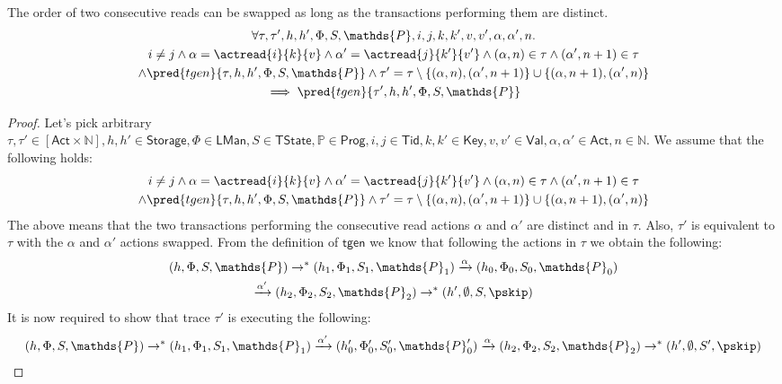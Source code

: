 \lem \label{lem:rr} The order of two consecutive reads can be swapped as long as the transactions performing them are distinct.
\begin{gather*}
	\forall \tau, \tau', h, h', \Phi, S, \mathds{P}, i, j, k, k', v, v', \alpha, \alpha', n \ldotp \\
	i \neq j \land \alpha = \actread{i}{k}{v} \land \alpha' = \actread{j}{k'}{v'} \land (\alpha, n) \in \tau \land (\alpha', n+1) \in \tau \\ \land \pred{tgen}{\tau, h, h', \Phi, S, \mathds{P}} \land \tau' = \tau \setminus \{(\alpha, n), (\alpha', n+1)\} \cup \{ (\alpha, n+1), (\alpha', n) \}
		\\	 
	 \implies \pred{tgen}{\tau', h, h', \Phi, S, \mathds{P}}
\end{gather*}
\begin{proof}
Let's pick arbitrary $\tau, \tau' \in [\mathsf{Act} \times \mathds{N}], h, h' \in \mathsf{Storage}, \Phi \in \mathsf{LMan}, S \in \mathsf{TState}, \mathds{P} \in \mathsf{Prog}, i, j \in \mathsf{Tid}, k, k' \in \mathsf{Key}, v, v' \in \mathsf{Val}, \alpha, \alpha' \in \mathsf{Act}, n \in \mathds{N}$. We assume that the following holds:
\begin{gather*}
	i \neq j \land \alpha = \actread{i}{k}{v} \land \alpha' = \actread{j}{k'}{v'} \land (\alpha, n) \in \tau \land (\alpha', n+1) \in \tau \\ \land \pred{tgen}{\tau, h, h', \Phi, S, \mathds{P}} \land \tau' = \tau \setminus \{(\alpha, n), (\alpha', n+1)\} \cup \{ (\alpha, n+1), (\alpha', n) \}
\end{gather*}
The above means that the two transactions performing the consecutive read actions $\alpha$ and $\alpha'$ are distinct and in $\tau$. Also, $\tau'$ is equivalent to $\tau$ with the $\alpha$ and $\alpha'$ actions swapped. From the definition of $\mathsf{tgen}$ we know that following the actions in $\tau$ we obtain the following:
\begin{gather}
	\label{lem:rr1} (h, \Phi, S, \mathds{P}) \rightarrow^* (h_1, \Phi_1, S_1, \mathds{P}_1) \xrightarrow{\alpha} (h_0, \Phi_0, S_0, \mathds{P}_0) \\
	\label{lem:rr2} \xrightarrow{\alpha'} (h_2, \Phi_2, S_2, \mathds{P}_2) \rightarrow^* (h', \emptyset, S, \pskip)
\end{gather}
It is now required to show that trace $\tau'$ is executing the following:
\[
	(h, \Phi, S, \mathds{P}) \rightarrow^* (h_1, \Phi_1, S_1, \mathds{P}_1) \xrightarrow{\alpha'} (h_0', \Phi_0', S_0', \mathds{P}_0') \xrightarrow{\alpha} (h_2, \Phi_2, S_2, \mathds{P}_2) \rightarrow^* (h', \emptyset, S', \pskip)
\]
\end{proof}
